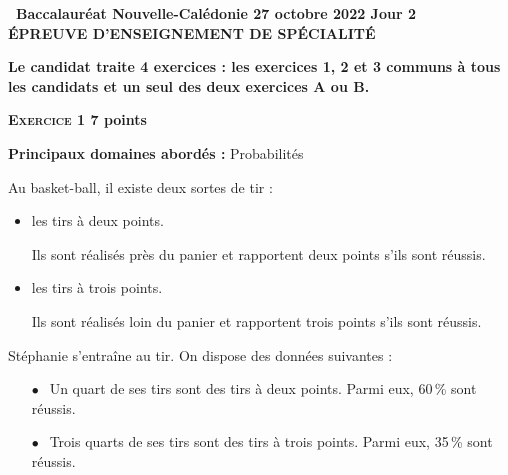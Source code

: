 \documentclass[11pt]{article}
\begin{document}
\setlength\parindent{0mm}
\pagestyle{fancy}
\thispagestyle{empty}

\begin{center}{\Large\textbf{\decofourleft~Baccalauréat Nouvelle-Calédonie 27 octobre 2022 Jour 2~\decofourright\\[7pt] ÉPREUVE D'ENSEIGNEMENT DE SPÉCIALITÉ}}
\end{center}

\vspace{0,25cm}

\textbf{Le candidat traite 4 exercices : les exercices 1, 2 et 3 communs à tous les candidats et un seul des deux exercices A ou B.}

\bigskip

\textbf{\textsc{Exercice 1} \hfill 7 points}

\textbf{Principaux domaines abordés :} Probabilités

\medskip

Au basket-ball, il existe deux sortes de tir :

\begin{itemize}
\item les tirs à deux points.

Ils sont réalisés près du panier et rapportent deux points s'ils sont réussis.
\item les tirs à trois points.

Ils sont réalisés loin du panier et rapportent trois points s'ils sont réussis.
\end{itemize}

\smallskip

Stéphanie s'entraîne au tir. On dispose des données suivantes :

\begin{itemize}
\item[$\bullet~~$] Un quart de ses tirs sont des tirs à deux points. Parmi eux, 60\,\% sont réussis.
\item[$\bullet~~$] Trois quarts de ses tirs sont des tirs à trois points. Parmi eux, 35\,\% sont réussis.
\end{itemize}

\medskip
\end{document}
